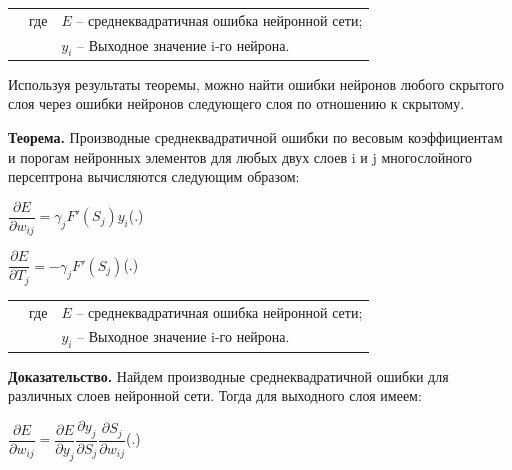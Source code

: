 	\begin{tabular}{p{}p{}p{}}
		& где  & $E$ {--} среднеквадратичная ошибка нейронной сети; \\
		&      & $y_{i}$ {--} Выходное значение i-го нейрона. \\
	\end{tabular}
	
	\par \redline Используя результаты теоремы, можно найти ошибки нейронов любого скрытого слоя через ошибки нейронов следующего слоя по отношению к скрытому. 
%	

    \par \redline \textbf{Теорема.} Производные среднеквадратичной ошибки по весовым коэффициентам и порогам нейронных элементов для любых двух слоев i и j многослойного персептрона вычисляются следующим образом:
	
	\formulaspace \par \redline 
	$ \dfrac{\partial E}{\partial w_{ij}} = \gamma_{j} F'(S_{j}) y_{i}$\hfill (\thechaptercntr .\theformulacntr) \redline
	\formulaspace \addtocounter{formulacntr}{1}
	
	\formulaspace \par \redline 
	$\dfrac{\partial E}{\partial T_{j}} = - \gamma_{j} F'(S_{j})$\hfill (\thechaptercntr .\theformulacntr) \redline
	\formulaspace \addtocounter{formulacntr}{1}
	
	\begin{tabular}{p{}p{}p{}}
		& где  & $E$ {--} среднеквадратичная ошибка нейронной сети; \\
		&      & $y_{i}$ {--} Выходное значение i-го нейрона. \\
	\end{tabular}
	
	\par \redline \textbf{Доказательство.} Найдем производные среднеквадратичной ошибки для различных слоев нейронной сети. Тогда для выходного слоя имеем:
	
	\formulaspace \par \redline 
	$\dfrac{\partial E}{\partial w_{ij}} = \dfrac{\partial E}{\partial y_j} \dfrac{\partial y_j}{\partial S_j} \dfrac{\partial S_j}{\partial w_{ij}}$\hfill (\thechaptercntr .\theformulacntr) \redline
	\formulaspace \addtocounter{formulacntr}{1}
	
